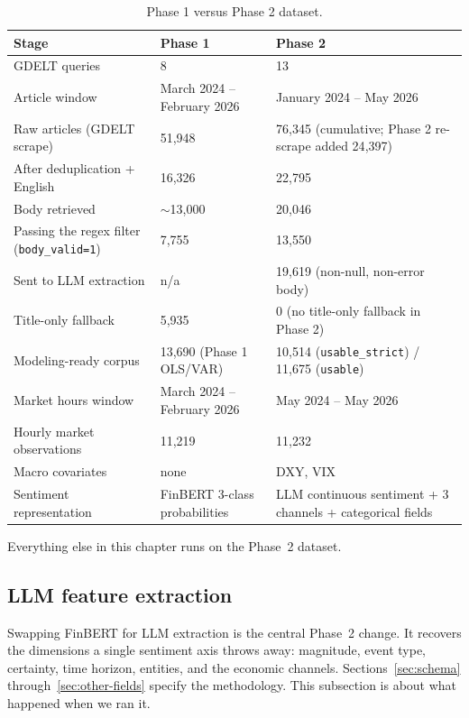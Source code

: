 \begin{table}[h]
  \centering
  \small
  \caption{Phase 1 versus Phase 2 dataset.}
  \label{tab:phase-comparison-data}
  \begin{tabular}{@{}p{3cm}p{4.7cm}p{5.7cm}@{}}
    \toprule
    Stage & Phase 1 & Phase 2 \\
    \midrule
    GDELT queries & 8 & 13 \\
    Article window & March 2024 -- February 2026 & January 2024 -- May 2026 \\
    Raw articles (GDELT scrape) & 51{,}948 & 76{,}345 (cumulative; Phase 2 re-scrape added 24{,}397) \\
    After deduplication + English & 16{,}326 & 22{,}795 \\
    Body retrieved & $\sim$13{,}000 & 20{,}046 \\
    Passing the regex filter (\texttt{body\_valid=1}) & 7{,}755 & 13{,}550 \\
    Sent to LLM extraction & n/a & 19{,}619 (non-null, non-error body) \\
    Title-only fallback & 5{,}935 & 0 (no title-only fallback in Phase 2) \\
    Modeling-ready corpus & 13{,}690 (Phase 1 OLS/VAR) & 10{,}514 (\texttt{usable\_strict}) / 11{,}675 (\texttt{usable}) \\
    Market hours window & March 2024 -- February 2026 & May 2024 -- May 2026 \\
    Hourly market observations & 11{,}219 & 11{,}232 \\
    Macro covariates & none & DXY, VIX \\
    Sentiment representation & FinBERT 3-class probabilities & LLM continuous sentiment + 3 channels + categorical fields \\
    \bottomrule
  \end{tabular}
\end{table}

Everything else in this chapter runs on the Phase~2 dataset.

\subsection{LLM feature extraction}\label{sec:llm-extraction}

Swapping FinBERT for LLM extraction is the central Phase~2 change. It recovers the dimensions a single sentiment axis throws away: magnitude, event type, certainty, time horizon, entities, and the economic channels. Sections~\ref{sec:schema} through~\ref{sec:other-fields} specify the methodology. This subsection is about what happened when we ran it.

